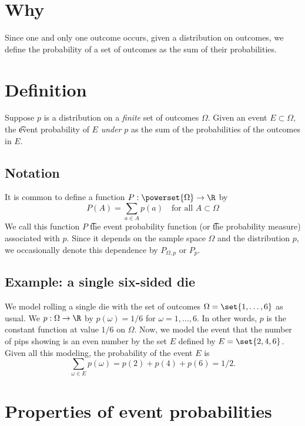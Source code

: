 

\section*{Why}

Since one and only one outcome occurs, given a distribution on outcomes, we define the probability of a set of outcomes as the sum of their probabilities.

\section*{Definition}

Suppose $p$ is a distribution on a \textit{finite} set of outcomes $\Omega $.
Given an event $E \subset \Omega $, the \t{event probability} of $E$ \textit{under} $p$ as the sum of the probabilities of the outcomes in $E$.

\subsection*{Notation}

It is common to define a function $P: \powerset{\Omega } \to \R $ by
\[
P(A) = \sum_{a \in A} p(a) \quad \text{for all } A \subset \Omega
\]
We call this function $P$ \t{the event probability function} (or \t{the probability measure}) associated with $p$.
Since it depends on the sample space $\Omega $ and the distribution $p$, we occasionally denote this dependence by $P_{\Omega , p}$ or $P_p$.

\subsection*{Example: a single six-sided die}

We model rolling a single die with the set of outcomes $\Omega  = \set{1, \dots , 6}$ as usual.
We $p: \Omega  \to \R $ by $p(\omega ) = 1/6$ for $\omega  = 1, \dots , 6$.
In other words, $p$ is the constant function at value $1/6$ on $\Omega $.
Now, we model the event that the number of pips showing is an even number by the set $E$ defined by $E = \set{2, 4, 6}$.
Given all this modeling, the probability of the event $E$ is
\[
\textstyle
\sum_{\omega  \in E} p(\omega ) = p(2) + p(4) + p(6) = 1/2.
\]

\section*{Properties of event probabilities}

